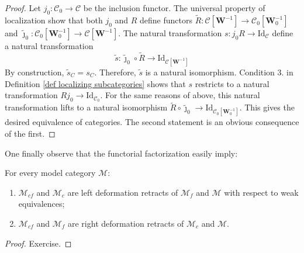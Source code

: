 \begin{refsection}
\begin{proof}
Let $j_0 \colon \mathcal C_0 \to \mathcal C$ be the inclusion functor. The universal property of localization show that both $j_0$ and $R$ define functors $\widetilde{R} \colon \mathcal C[\mathbf W^{-1}] \to \mathcal C_0[\mathbf W_0^{-1}]$ and $\widetilde{\jmath}_0 \colon \mathcal C_0[\mathbf W_0^{-1}] \to \mathcal C[\mathbf W^{-1}]$. The natural transformation $s \colon j_0 R \to \mathrm{Id}_{\mathcal C}$ define a natural transformation
\[
\widetilde{s} \colon \widetilde{\jmath}_0 \circ \widetilde{R} \to \mathrm{Id}_{\mathcal C[\mathbf W^{-1}]}
\]
By construction, $\widetilde{s}_C = s_C$. Therefore, $\widetilde{s}$ is a natural isomorphism. Condition 3. in Definition \ref{def localizing subcategories} shows that $s$ restricts to a natural transformation $R j_0 \to \mathrm{Id}_{\mathcal C_0}$. For the same reasons of above, this natural transformation lifts to a natural isomorphism $\widetilde{R} \circ  \widetilde{\jmath}_0 \to \mathrm{Id}_{\mathcal C_0[\mathbf W_0^{-1}]}$. This gives the desired equivalence of categories. The second statement is an obvious consequence of the first.
\end{proof}

One finally observe that the functorial factorization easily imply:

\begin{prop} \label{prop reduction step}
For every model category $\mathcal M$:
\begin{enumerate}
\item $\mathcal M_{cf}$ and $\mathcal M_c$ are left deformation retracts of $\mathcal M_f$ and $\mathcal M$ with respect to weak equivalences;
\item $\mathcal M_{cf}$ and $\mathcal M_f$ are right deformation retracts of $\mathcal M_c$ and $\mathcal M$.
\end{enumerate}
\end{prop}

\begin{proof}
Exercise.
\end{proof}


\end{refsection}
